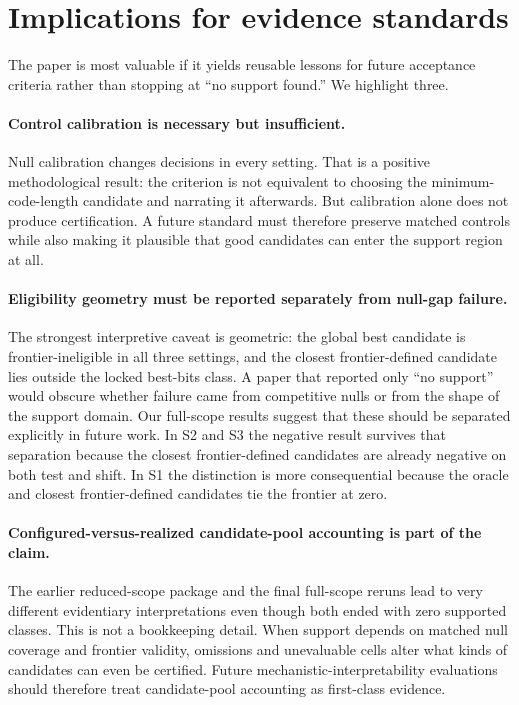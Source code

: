 \documentclass[10pt]{article}
\begin{document}
\section{Implications for evidence standards}

The paper is most valuable if it yields reusable lessons for future acceptance criteria rather than stopping at ``no support found.'' We highlight three.

\paragraph{Control calibration is necessary but insufficient.}
Null calibration changes decisions in every setting. That is a positive methodological result: the criterion is not equivalent to choosing the minimum-code-length candidate and narrating it afterwards. But calibration alone does not produce certification. A future standard must therefore preserve matched controls while also making it plausible that good candidates can enter the support region at all.

\paragraph{Eligibility geometry must be reported separately from null-gap failure.}
The strongest interpretive caveat is geometric: the global best candidate is frontier-ineligible in all three settings, and the closest frontier-defined candidate lies outside the locked best-bits class. A paper that reported only ``no support'' would obscure whether failure came from competitive nulls or from the shape of the support domain. Our full-scope results suggest that these should be separated explicitly in future work. In S2 and S3 the negative result survives that separation because the closest frontier-defined candidates are already negative on both test and shift. In S1 the distinction is more consequential because the oracle and closest frontier-defined candidates tie the frontier at zero.

\paragraph{Configured-versus-realized candidate-pool accounting is part of the claim.}
The earlier reduced-scope package and the final full-scope reruns lead to very different evidentiary interpretations even though both ended with zero supported classes. This is not a bookkeeping detail. When support depends on matched null coverage and frontier validity, omissions and unevaluable cells alter what kinds of candidates can even be certified. Future mechanistic-interpretability evaluations should therefore treat candidate-pool accounting as first-class evidence.
\end{document}
